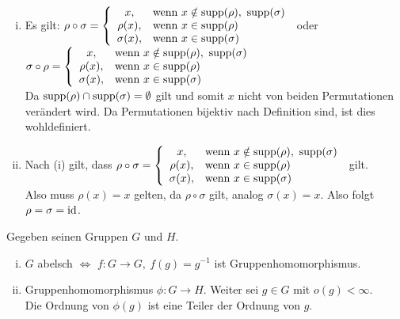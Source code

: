 \\
\begin{enumerate}[(i)]
	\item Es gilt: $\rho\circ\sigma=\left\{\begin{array}{cl} x, & \text{wenn } x\notin \operatorname{supp}(\rho),~\operatorname{supp}(\sigma)\\ \rho(x), & \text{wenn } x\in \operatorname{supp}(\rho)\\ \sigma(x), & \text{wenn } x\in \operatorname{supp}(\sigma) \end{array}\right.$
	oder 
	$\sigma\circ\rho=\left\{\begin{array}{cl} x, & \text{wenn } x\notin \operatorname{supp}(\rho),~\operatorname{supp}(\sigma)\\ \rho(x), & \text{wenn } x\in \operatorname{supp}(\rho)\\ \sigma(x), & \text{wenn } x\in \operatorname{supp}(\sigma) \end{array}\right.$\\
	
	Da $\operatorname{supp}(\rho)\cap \operatorname{supp}(\sigma)=\emptyset$ gilt und somit $x$ nicht von beiden Permutationen verändert wird. Da Permutationen bijektiv nach Definition sind, ist dies wohldefiniert.
	\item Nach (i) gilt, dass $\rho\circ\sigma=\left\{\begin{array}{cl} x, & \text{wenn } x\notin \operatorname{supp}(\rho),~\operatorname{supp}(\sigma)\\ \rho(x), & \text{wenn } x\in \operatorname{supp}(\rho)\\ \sigma(x), & \text{wenn } x\in \operatorname{supp}(\sigma) \end{array}\right.$ gilt.\\
	
	Also muss $\rho(x)=x$ gelten, da $\rho\circ\sigma$ gilt, analog $\sigma(x)=x$. Also folgt $\rho=\sigma=\operatorname{id}$.
\end{enumerate}

\newpage

\label{sub:zettel_3alg}

Gegeben seinen Gruppen $G$ und $H$.\\
\begin{enumerate}[(i)]
	\item $G$ abelsch $\Leftrightarrow$ $f:G\to G,~ f(g)=g^{-1}$ ist Gruppenhomomorphismus.
	\item Gruppenhomomorphismus $\phi:G\to H$. Weiter sei $g\in G$ mit $o(g)<\infty$.\\
	Die Ordnung von $\phi(g)$ ist eine Teiler der Ordnung von $g$.
\end{enumerate}

